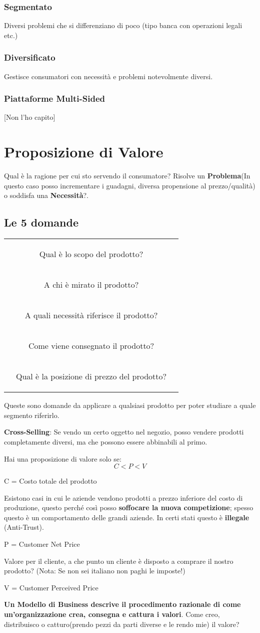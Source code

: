 \documentclass[twocolumn]{article}
\newcommand{\definition}[1]{\begin{mycolorbox}[colback=colorone]
\fontfamily{qcr}\selectfont #1 \fontfamily{cmr}\selectfont
\end{mycolorbox}}
\begin{document}
\subsubsection{Segmentato}
Diversi problemi che si differenziano di poco (tipo banca con operazioni legali etc.)
\subsubsection{Diversificato}
Gestisce consumatori con necessità e problemi notevolmente diversi.
\subsubsection{Piattaforme Multi-Sided}
[Non l'ho capito]
\section{Proposizione di Valore}
Qual è la ragione per cui sto servendo il consumatore? Risolve un \textbf{Problema}(In questo caso posso incrementare i guadagni, diversa propensione al prezzo/qualità) o soddisfa una \textbf{Necessità}?.
\subsection{Le 5 domande}
\begingroup
\begin{tabular}{X|c|c}
& \definition{Qual è lo scopo del prodotto?} &  \\
& \definition{A chi è mirato il prodotto?} & \\
& \definition{A quali necessità riferisce il prodotto?} & \\
& \definition{Come viene consegnato il prodotto?} & \\
& \definition{Qual è la posizione di prezzo del prodotto?} & \\
\end{tabular}
\endgroup
Queste sono domande da applicare a qualsiasi prodotto per poter studiare a quale segmento riferirlo.
\begingroup
\definition{\textbf{Cross-Selling}: Se vendo un certo oggetto nel negozio, posso vendere prodotti completamente diversi, ma che possono essere abbinabili al primo.}
\endgroup
Hai una proposizione di valore solo se:
\[C < P < V\]
\begingroup
\definition{C = Costo totale del prodotto} Esistono casi in cui le aziende vendono prodotti a prezzo inferiore del costo di produzione, questo perché così posso \textbf{soffocare la nuova competizione}; spesso questo è un comportamento delle grandi aziende. In certi stati questo è \textbf{illegale} (Anti-Trust). 
\definition{P = Customer Net Price} Valore per il cliente, a che punto un cliente è disposto a comprare il nostro prodotto? (Nota: Se non sei italiano non paghi le imposte!)
\definition{V = Customer Perceived Price}
\endgroup
\textbf{Un Modello di Business descrive il procedimento razionale di come un'organizzazione crea, consegna e cattura i valori}. Come creo, distribuisco o catturo(prendo pezzi da parti diverse e le rendo mie) il valore?
\end{document}
